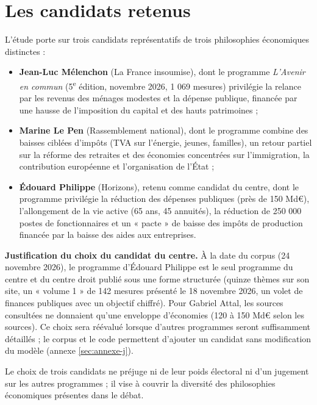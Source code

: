 \documentclass[
  11pt,
  11pt,
  a4paper,
  openany]{book}
\providecommand{\tightlist}{%
  \setlength{\itemsep}{0pt}\setlength{\parskip}{0pt}}
\begin{document}
\hypertarget{sec:candidats}{%
\section{Les candidats retenus}\label{sec:candidats}}

L'étude porte sur trois candidats représentatifs de trois philosophies
économiques distinctes :

\begin{itemize}
\tightlist
\item
  \textbf{Jean-Luc Mélenchon} (La France insoumise), dont le programme
  \emph{L'Avenir en commun} (5\textsuperscript{e} édition, novembre
  2026, 1 069 mesures) privilégie la relance par les revenus des ménages
  modestes et la dépense publique, financée par une hausse de
  l'imposition du capital et des hauts patrimoines ;
\item
  \textbf{Marine Le Pen} (Rassemblement national), dont le programme
  combine des baisses ciblées d'impôts (TVA sur l'énergie, jeunes,
  familles), un retour partiel sur la réforme des retraites et des
  économies concentrées sur l'immigration, la contribution européenne et
  l'organisation de l'État ;
\item
  \textbf{Édouard Philippe} (Horizons), retenu comme candidat du centre,
  dont le programme privilégie la réduction des dépenses publiques (près
  de 150 Md€), l'allongement de la vie active (65 ans, 45 annuités), la
  réduction de 250 000 postes de fonctionnaires et un « pacte » de
  baisse des impôts de production financée par la baisse des aides aux
  entreprises.
\end{itemize}

\textbf{Justification du choix du candidat du centre.} À la date du
corpus (24 novembre 2026), le programme d'Édouard Philippe est le seul
programme du centre et du centre droit publié sous une forme structurée
(quinze thèmes sur son site, un « volume 1 » de 142 mesures présenté le
18 novembre 2026, un volet de finances publiques avec un objectif
chiffré). Pour Gabriel Attal, les sources consultées ne donnaient qu'une
enveloppe d'économies (120 à 150 Md€ selon les sources). Ce choix sera
réévalué lorsque d'autres programmes seront suffisamment détaillés ; le
corpus et le code permettent d'ajouter un candidat sans modification du
modèle (annexe \ref{sec:annexe-j}).

Le choix de trois candidats ne préjuge ni de leur poids électoral ni
d'un jugement sur les autres programmes ; il vise à couvrir la diversité
des philosophies économiques présentes dans le débat.
\end{document}
